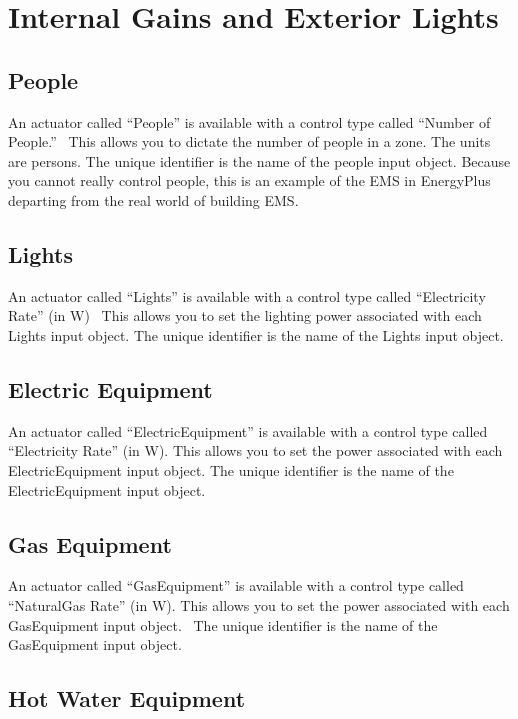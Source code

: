 \section{Internal Gains and Exterior Lights}\label{internal-gains-and-exterior-lights}

\subsection{People}\label{people}

An actuator called ``People'' is available with a control type called ``Number of People.''~ This allows you to dictate the number of people in a zone. The units are persons. The unique identifier is the name of the people input object. Because you cannot really control people, this is an example of the EMS in EnergyPlus departing from the real world of building EMS.

\subsection{Lights}\label{lights}

An actuator called ``Lights'' is available with a control type called ``Electricity Rate'' (in W)~ This allows you to set the lighting power associated with each Lights input object. The unique identifier is the name of the Lights input object.

\subsection{Electric Equipment}\label{electric-equipment}

An actuator called ``ElectricEquipment'' is available with a control type called ``Electricity Rate'' (in W). This allows you to set the power associated with each ElectricEquipment input object. The unique identifier is the name of the ElectricEquipment input object.

\subsection{Gas Equipment}\label{gas-equipment}

An actuator called ``GasEquipment'' is available with a control type called ``NaturalGas Rate'' (in W). This allows you to set the power associated with each GasEquipment input object.~ The unique identifier is the name of the GasEquipment input object.

\subsection{Hot Water Equipment}\label{hot-water-equipment}

